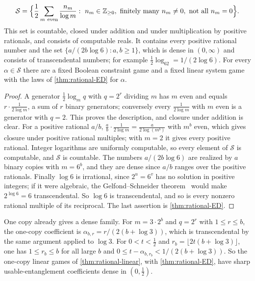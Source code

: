 \begin{corollary}\label{cor:coefficient-set}
\[
\mathcal S=\Bigl\{\frac12\sum_{m\ \mathrm{even}}\frac{n_m}{\log m}:\ n_m\in\Z_{\ge0},\ \text{finitely many }n_m\ne0,\ \text{not all }n_m=0\Bigr\}.
\]
This set is countable, closed under addition and under multiplication by positive rationals, and consists of computable reals. It contains
every positive rational number and the set $\{a/(2b\log6):a,b\ge1\}$, which is dense in $(0,\infty)$ and consists of transcendental
numbers; for example $\frac12\log_62=1/(2\log6)$. For every $\alpha\in\mathcal S$ there are a fixed Boolean constraint game and a fixed linear
system game with the laws of \cref{thm:rational-ED} for $\alpha$.
\end{corollary}

\begin{proof}
A generator $\frac12\log_mq$ with $q=2^r$ dividing $m$ has $m$ even and equals $r\cdot\frac1{2\log m}$, a sum of $r$ binary generators;
conversely every $\frac1{2\log m}$ with $m$ even is a generator with $q=2$. This proves the description, and closure under addition is
clear. For a positive rational $a/b$, $\frac ab\cdot\frac1{2\log m}=\frac a{2\log(m^b)}$ with $m^b$ even, which gives closure under positive
rational multiples; with $m=2$ it gives every positive rational. Integer logarithms are uniformly computable, so every element of $\mathcal S$
is computable, and $\mathcal S$ is countable. The numbers $a/(2b\log6)$ are realized by $a$ binary copies with $m=6^b$, and they are dense
since $a/b$ ranges over the positive rationals. Finally $\log6$ is irrational, since $2^u=6^v$ has no solution in positive integers; if it
were algebraic, the Gelfond--Schneider theorem~\cite{Gel34,Sch35} would make $2^{\log6}=6$ transcendental. So $\log6$ is transcendental, and
so is every nonzero rational multiple of its reciprocal. The last assertion is \cref{thm:rational-ED}.
\end{proof}

One copy already gives a dense family. For $m=3\cdot2^b$ and $q=2^r$ with $1\le r\le b$, the one-copy coefficient is
$\alpha_{b,r}=r/(2(b+\log3))$, which is transcendental by the same argument applied to $\log3$. For $0<t<\frac12$ and
$r_b=\lfloor2t(b+\log3)\rfloor$, one has $1\le r_b\le b$ for all large $b$ and $0\le t-\alpha_{b,r_b}<1/(2(b+\log3))$. So the one-copy linear
games of \cref{thm:rational-linear}, with \cref{thm:rational-ED}, have sharp usable-entanglement coefficients dense in $(0,\frac12)$.

